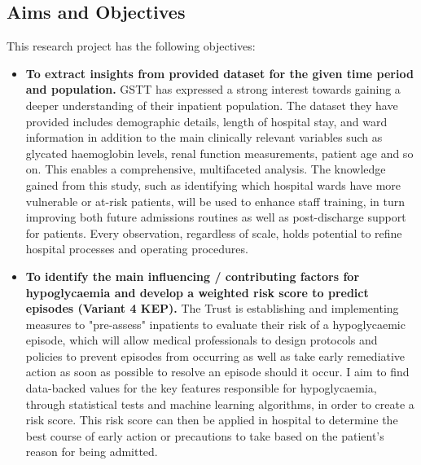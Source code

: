 \subsection{Aims and Objectives} 
This research project has the following objectives:

\begin{itemize}
	\item \textbf{To extract insights from provided dataset for the given time period and population.} GSTT has expressed a strong interest towards gaining a deeper understanding of their inpatient population. The dataset they have provided includes demographic details, length of hospital stay, and ward information in addition to the main clinically relevant variables such as glycated haemoglobin levels, renal function measurements, patient age and so on. This enables a comprehensive, multifaceted analysis. The knowledge gained from this study, such as identifying which hospital wards have more vulnerable or at-risk patients, will be used to enhance staff training, in turn improving both future admissions routines as well as post-discharge support for patients. Every observation, regardless of scale, holds potential to refine hospital processes and operating procedures.
	\item \textbf{To identify the main influencing / contributing factors for hypoglycaemia and develop a weighted risk score to predict episodes (Variant 4 KEP).} The Trust is establishing and implementing measures to "pre-assess" inpatients to evaluate their risk of a hypoglycaemic episode, which will allow medical professionals to design protocols and policies to prevent episodes from occurring as well as take early remediative action as soon as possible to resolve an episode should it occur. I aim to find data-backed values for the key features responsible for hypoglycaemia, through statistical tests and machine learning algorithms, in order to create a risk score. This risk score can then be applied in hospital to determine the best course of early action or precautions to take based on the patient's reason for being admitted.
\end{itemize}

